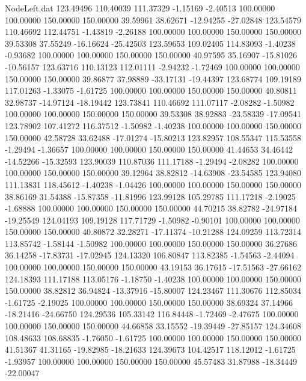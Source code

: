\begin{filecontents}{NodeLeft.dat}
 123.49496  110.40039  111.37329    -1.15169   -2.40513  100.00000  100.00000  150.00000  150.00000   39.59961   38.62671  -12.94255  -27.02848
 123.54579  110.46692  112.44751    -1.43819   -2.26188  100.00000  100.00000  150.00000  150.00000   39.53308   37.55249  -16.16624  -25.42503
 123.59653  109.02405  114.83093    -1.40238   -0.93682  100.00000  100.00000  150.00000  150.00000   40.97595   35.16907  -15.81026  -10.56157
 123.63716  110.13123  112.01111    -2.94232   -1.72469  100.00000  100.00000  150.00000  150.00000   39.86877   37.98889  -33.17131  -19.44397
 123.68774  109.19189  117.01263    -1.33075   -1.61725  100.00000  100.00000  150.00000  150.00000   40.80811   32.98737  -14.97124  -18.19442
 123.73841  110.46692  111.07117    -2.08282   -1.50982  100.00000  100.00000  150.00000  150.00000   39.53308   38.92883  -23.58339  -17.09541
 123.78902  107.41272  116.37512    -1.50982   -1.40238  100.00000  100.00000  150.00000  150.00000   42.58728   33.62488  -17.01274  -15.80213
 123.82957  108.55347  115.53558    -1.29494   -1.36657  100.00000  100.00000  150.00000  150.00000   41.44653   34.46442  -14.52266  -15.32593
 123.90039  110.87036  111.17188    -1.29494   -2.08282  100.00000  100.00000  150.00000  150.00000   39.12964   38.82812  -14.63908  -23.54585
 123.94080  111.13831  118.45612    -1.40238   -1.04426  100.00000  100.00000  150.00000  150.00000   38.86169   31.54388  -15.87358  -11.81996
 123.99128  105.29785  111.17218    -2.19025   -1.68888  100.00000  100.00000  150.00000  150.00000   44.70215   38.82782  -24.97184  -19.25549
 124.04193  109.19128  117.71729    -1.50982   -0.90101  100.00000  100.00000  150.00000  150.00000   40.80872   32.28271  -17.11374  -10.21288
 124.09259  113.72314  113.85742    -1.58144   -1.50982  100.00000  100.00000  150.00000  150.00000   36.27686   36.14258  -17.83731  -17.02945
 124.13320  106.80847  113.82385    -1.54563   -2.44094  100.00000  100.00000  150.00000  150.00000   43.19153   36.17615  -17.51563  -27.66162
 124.18393  111.17188  113.05176    -1.18750   -1.40238  100.00000  100.00000  150.00000  150.00000   38.82812   36.94824  -13.37916  -15.80007
 124.23467  111.30676  112.85034    -1.61725   -2.19025  100.00000  100.00000  150.00000  150.00000   38.69324   37.14966  -18.21416  -24.66750
 124.29536  105.33142  116.84448    -1.72469   -2.47675  100.00000  100.00000  150.00000  150.00000   44.66858   33.15552  -19.39449  -27.85157
 124.34608  108.48633  108.68835    -1.76050   -1.61725  100.00000  100.00000  150.00000  150.00000   41.51367   41.31165  -19.82985  -18.21633
 124.39673  104.42517  118.12012    -1.61725   -1.93957  100.00000  100.00000  150.00000  150.00000   45.57483   31.87988  -18.34449  -22.00047

\end{filecontents}

